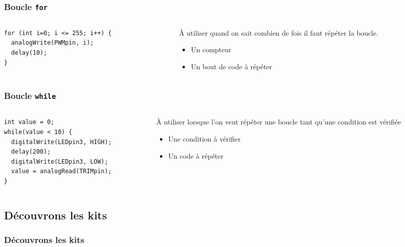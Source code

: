 \documentclass[aspectratio=169,utf8]{beamer}
\begin{document}
\begin{frame}[fragile]
  \frametitle{Boucle \lstinline{for}}
  \begin{columns}
    \begin{column}{.5\textwidth}
      \begin{lstlisting}
for (int i=0; i <= 255; i++) {
  analogWrite(PWMpin, i);
  delay(10);
}
      \end{lstlisting}
    \end{column}
    \begin{column}{.5\textwidth}
      À utiliser quand on sait combien de fois il faut répéter la boucle.
      \begin{itemize}
        \item Un compteur
        \item Un bout de code à répéter
      \end{itemize}
    \end{column}
  \end{columns}
\end{frame}

\begin{frame}[fragile]
  \frametitle{Boucle \lstinline{while}}
  \begin{columns}
    \begin{column}{.5\textwidth}
      \begin{lstlisting}
int value = 0;
while(value < 10) {
  digitalWrite(LEDpin3, HIGH);
  delay(200);
  digitalWrite(LEDpin3, LOW);
  value = analogRead(TRIMpin);
}
      \end{lstlisting}
    \end{column}
    \begin{column}{.5\textwidth}
      À utiliser lorsque l’on veut répéter une boucle tant qu’une condition est vérifiée
      \begin{itemize}
        \item Une condition à vérifier
        \item Un code à répéter
      \end{itemize}
    \end{column}
  \end{columns}
\end{frame}

\subsection{Découvrons les kits}

\begin{frame}
  \frametitle{Découvrons les kits}
\end{frame}
\end{document}
